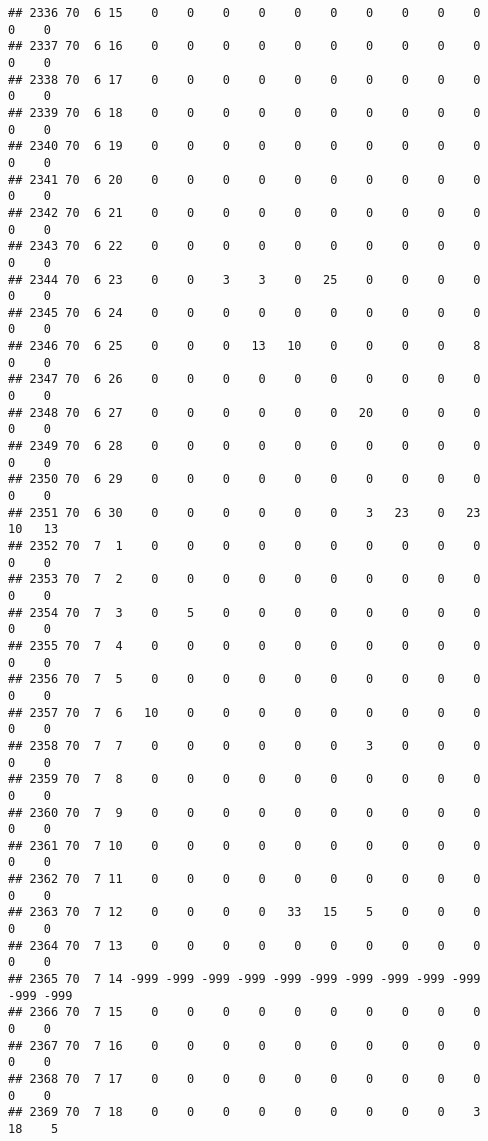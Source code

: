\documentclass[]{article}
\begin{document}
\begin{verbatim}
## 2336 70  6 15    0    0    0    0    0    0    0    0    0    0    0    0
## 2337 70  6 16    0    0    0    0    0    0    0    0    0    0    0    0
## 2338 70  6 17    0    0    0    0    0    0    0    0    0    0    0    0
## 2339 70  6 18    0    0    0    0    0    0    0    0    0    0    0    0
## 2340 70  6 19    0    0    0    0    0    0    0    0    0    0    0    0
## 2341 70  6 20    0    0    0    0    0    0    0    0    0    0    0    0
## 2342 70  6 21    0    0    0    0    0    0    0    0    0    0    0    0
## 2343 70  6 22    0    0    0    0    0    0    0    0    0    0    0    0
## 2344 70  6 23    0    0    3    3    0   25    0    0    0    0    0    0
## 2345 70  6 24    0    0    0    0    0    0    0    0    0    0    0    0
## 2346 70  6 25    0    0    0   13   10    0    0    0    0    8    0    0
## 2347 70  6 26    0    0    0    0    0    0    0    0    0    0    0    0
## 2348 70  6 27    0    0    0    0    0    0   20    0    0    0    0    0
## 2349 70  6 28    0    0    0    0    0    0    0    0    0    0    0    0
## 2350 70  6 29    0    0    0    0    0    0    0    0    0    0    0    0
## 2351 70  6 30    0    0    0    0    0    0    3   23    0   23   10   13
## 2352 70  7  1    0    0    0    0    0    0    0    0    0    0    0    0
## 2353 70  7  2    0    0    0    0    0    0    0    0    0    0    0    0
## 2354 70  7  3    0    5    0    0    0    0    0    0    0    0    0    0
## 2355 70  7  4    0    0    0    0    0    0    0    0    0    0    0    0
## 2356 70  7  5    0    0    0    0    0    0    0    0    0    0    0    0
## 2357 70  7  6   10    0    0    0    0    0    0    0    0    0    0    0
## 2358 70  7  7    0    0    0    0    0    0    3    0    0    0    0    0
## 2359 70  7  8    0    0    0    0    0    0    0    0    0    0    0    0
## 2360 70  7  9    0    0    0    0    0    0    0    0    0    0    0    0
## 2361 70  7 10    0    0    0    0    0    0    0    0    0    0    0    0
## 2362 70  7 11    0    0    0    0    0    0    0    0    0    0    0    0
## 2363 70  7 12    0    0    0    0   33   15    5    0    0    0    0    0
## 2364 70  7 13    0    0    0    0    0    0    0    0    0    0    0    0
## 2365 70  7 14 -999 -999 -999 -999 -999 -999 -999 -999 -999 -999 -999 -999
## 2366 70  7 15    0    0    0    0    0    0    0    0    0    0    0    0
## 2367 70  7 16    0    0    0    0    0    0    0    0    0    0    0    0
## 2368 70  7 17    0    0    0    0    0    0    0    0    0    0    0    0
## 2369 70  7 18    0    0    0    0    0    0    0    0    0    3   18    5

\end{verbatim}
\end{document}
